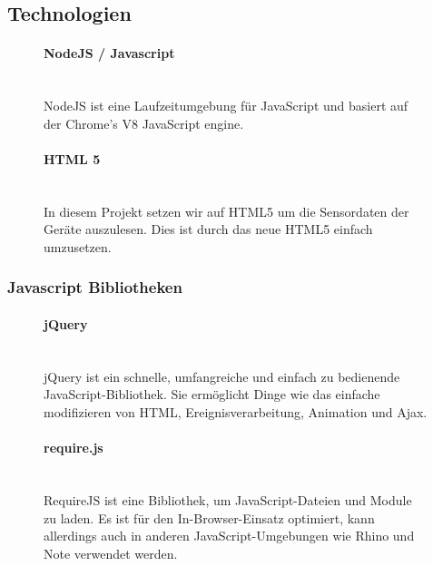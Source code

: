 \documentclass[a4paper]{spie}  %
\begin{document}
\subsection{Technologien} %
\begin{figure}[H]
\begin{minipage}[t]{0.4\textwidth}
\vspace{0pt}
\paragraph{NodeJS / Javascript}\mbox{}\\
NodeJS ist eine Laufzeitumgebung für JavaScript und basiert auf der Chrome's V8 JavaScript engine. 

\end{minipage}
\hfill
\begin{minipage}[t]{0.5\textwidth}
\vspace{0pt}
\paragraph{HTML 5}\mbox{}\\
In diesem Projekt setzen wir auf HTML5 um die Sensordaten der Geräte auszulesen. Dies ist durch das neue HTML5 einfach umzusetzen.
\end{minipage}
\end{figure}

\subsubsection{Javascript Bibliotheken}

\begin{figure}[H]
\begin{minipage}[t]{0.4\textwidth}
\vspace{0pt}
\paragraph{jQuery}\mbox{}\\
jQuery ist ein schnelle, umfangreiche und einfach zu bedienende JavaScript-Bibliothek. Sie ermöglicht Dinge wie das einfache modifizieren von HTML, Ereignisverarbeitung, Animation und Ajax.
\end{minipage}
\hfill
\begin{minipage}[t]{0.5\textwidth}
\vspace{0pt}
\paragraph{require.js}\mbox{}\\
RequireJS ist eine Bibliothek, um JavaScript-Dateien und Module zu laden. Es ist für den In-Browser-Einsatz optimiert, kann allerdings auch in anderen JavaScript-Umgebungen wie Rhino und Note verwendet werden.
\end{minipage}
\end{figure}
\end{document}
